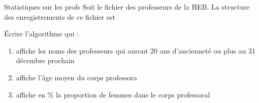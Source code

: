 \begin{Exercice}{Statistiques sur les profs}
	Soit le fichier  des professeurs de la
	HEB. La structure des enregistrements de ce fichier est {}
	
	
	Écrire l’algorithme qui :
	
	\begin{enumerate}[label=\alph*)]
		\item 
			affiche les noms des professeurs qui auront 20 ans d’ancienneté ou plus
			au 31 décembre prochain
		\item 
			affiche l’âge moyen du corps professora
		\item 
			affiche en \% la proportion de femmes dans le corps professoral
	\end{enumerate}
\end{Exercice}

